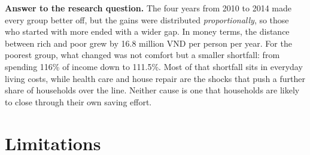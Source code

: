 \documentclass[11pt,a4paper]{article}
\begin{document}
\begin{tcolorbox}[colback=tintC, colframe=tintC, boxrule=0pt, arc=5pt, left=12pt, right=12pt, top=9pt, bottom=9pt]
\textbf{Answer to the research question.} The four years from 2010 to 2014 made every group better off, but the gains were distributed \emph{proportionally}, so those who started with more ended with a wider gap. In money terms, the distance between rich and poor grew by 16.8 million VND per person per year. For the poorest group, what changed was not comfort but a smaller shortfall: from spending 116\% of income down to 111.5\%. Most of that shortfall sits in everyday living costs, while health care and house repair are the shocks that push a further share of households over the line. Neither cause is one that households are likely to close through their own saving effort.
\end{tcolorbox}

\section{Limitations}
\end{document}
